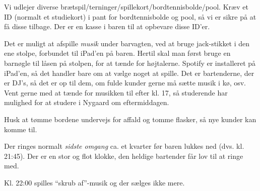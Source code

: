Vi udlejer diverse brætspil/terninger/spillekort/bordtennisbolde/pool. 
Kræv et ID (normalt et studiekort) i pant for bordtennisbolde og pool, 
så vi er sikre på at få disse tilbage. 
Der er en kasse i baren til at opbevare disse ID'er.

Det er muligt at afspille \textit{musik} under barvagten, ved at bruge
jack-stikket i den ene stolpe, forbundet til iPad'en på baren.
Hertil skal man først bruge en barnøgle
til låsen på stolpen, for at tænde for højtalerne.
Spotify er installeret på iPad'en, så det handler bare om at vælge noget at spille.
Det er bartenderne, der er DJ's, så det er op til dem,
om fulde kunder gerne må sætte musik i kø, osv.
Vent gerne med at tænde for musikken til efter kl. 17, så studerende har mulighed
for at studere i Nygaard om eftermiddagen.

Husk at tømme bordene undervejs for affald og tomme flasker, så nye
kunder kan komme til.

Der ringes normalt \textit{sidste omgang}
ca. et kvarter før baren lukkes ned
(dvs. kl. 21:45). Der er en stor og flot klokke, den heldige bartender
får lov til at ringe med.

Kl. 22:00 spilles ``skrub af''-musik og der sælges ikke mere.
